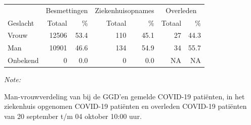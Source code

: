 \documentclass[
  english,
  man,floatsintext]{apa6}
\begin{document}
\begin{table}
\centering\begingroup\fontsize{11}{13}\selectfont

\begin{threeparttable}
\begin{tabular}{lrrrrrr}
\toprule
\multicolumn{1}{c}{ } & \multicolumn{2}{c}{Besmettingen} & \multicolumn{2}{c}{Ziekenhuisopnames} & \multicolumn{2}{c}{Overleden} \\
\cmidrule(l{3pt}r{3pt}){2-3} \cmidrule(l{3pt}r{3pt}){4-5} \cmidrule(l{3pt}r{3pt}){6-7}
Geslacht & Totaal & \% & Totaal & \% & Totaal & \%\\
\midrule
Vrouw & 12506 & 53.4 & 110 & 45.1 & 27 & 44.3\\
Man & 10901 & 46.6 & 134 & 54.9 & 34 & 55.7\\
Onbekend & 0 & 0.0 & 0 & 0.0 & NA & NA\\
\bottomrule
\end{tabular}
\begin{tablenotes}
\item \textit{Note: } 
\item Man-vrouwverdeling van bij de GGD’en gemelde COVID-19 patiënten, in het ziekenhuis opgenomen COVID-19 patiënten en overleden COVID-19 patiënten van 20 september t/m 04 oktober 10:00 uur.
\end{tablenotes}
\end{threeparttable}
\endgroup{}
\end{table}
\newpage
\end{document}
